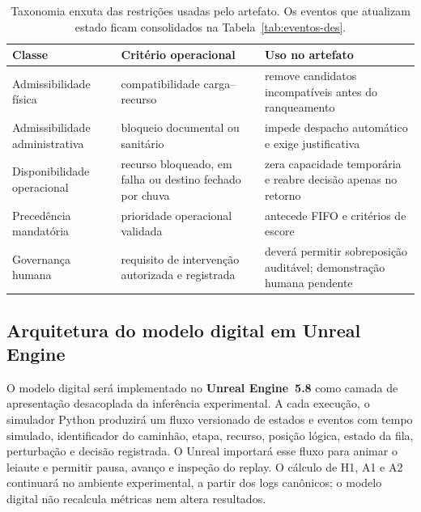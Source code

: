 \documentclass[
  12pt,
  oneside,
  a4paper,
  sumario=tradicional,
  brazil
]{abntex2}
\begin{document}
\begin{table}[H]
\centering
\small
\setlength{\tabcolsep}{6pt}
\renewcommand{\arraystretch}{1.16}
\begin{tabularx}{\textwidth}{@{}P{0.24\textwidth}P{0.32\textwidth}Y@{}}
\toprule
{}
\textbf{Classe} & \textbf{Crit\'erio operacional} & \textbf{Uso no artefato} \\
\midrule
Admissibilidade f\'isica & compatibilidade carga--recurso & remove candidatos incompat\'iveis antes do ranqueamento \\
\addlinespace
Admissibilidade administrativa & bloqueio documental ou sanit\'ario & impede despacho autom\'atico e exige justificativa \\
\addlinespace
Disponibilidade operacional & recurso bloqueado, em falha ou destino fechado por chuva & zera capacidade tempor\'aria e reabre decis\~ao apenas no retorno \\
\addlinespace
Preced\^encia mandat\'oria & prioridade operacional validada & antecede FIFO e crit\'erios de escore \\
\addlinespace
Governan\c{c}a humana & requisito de interven\c{c}\~ao autorizada e registrada & dever\'a permitir sobreposi\c{c}\~ao audit\'avel; demonstra\c{c}\~ao humana pendente \\
\bottomrule
\end{tabularx}
\caption[Taxonomia de restri\c{c}\~oes do artefato]{Taxonomia enxuta das restri\c{c}\~oes usadas pelo artefato. Os eventos que atualizam estado ficam consolidados na Tabela~\ref{tab:eventos-des}.}
\label{tab:taxonomia-restricoes-artefato}
\end{table}

\subsection{Arquitetura do modelo digital em Unreal Engine}

O modelo digital ser\'a implementado no \textbf{Unreal Engine~5.8} como camada de
apresenta\c{c}\~ao desacoplada da infer\^encia experimental. A cada execu\c{c}\~ao, o
simulador Python produzir\'a um fluxo versionado de estados e eventos com tempo simulado,
identificador do caminh\~ao, etapa, recurso, posi\c{c}\~ao l\'ogica, estado da fila,
perturba\c{c}\~ao e decis\~ao registrada. O Unreal importar\'a esse fluxo para animar o
leiaute e permitir pausa, avan\c{c}o e inspe\c{c}\~ao do replay. O c\'alculo de H1, A1 e A2
continuar\'a no ambiente experimental, a partir dos logs can\^onicos; o modelo digital n\~ao
recalcula m\'etricas nem altera resultados.
\end{document}
